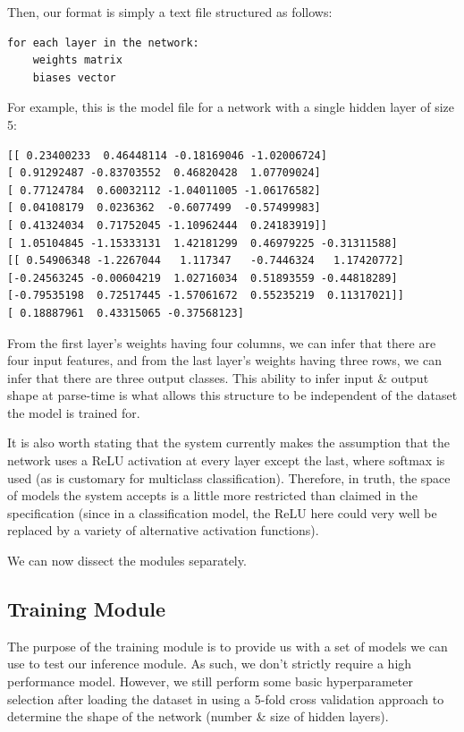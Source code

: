 \documentclass[12pt]{article}
\begin{document}
Then, our format is simply a text file structured as follows:
\begin{verbatim}
for each layer in the network:
    weights matrix
    biases vector
\end{verbatim}
For example, this is the model file for a network with a single hidden layer of size 5:
\begin{verbatim}
[[ 0.23400233  0.46448114 -0.18169046 -1.02006724]
[ 0.91292487 -0.83703552  0.46820428  1.07709024]
[ 0.77124784  0.60032112 -1.04011005 -1.06176582]
[ 0.04108179  0.0236362  -0.6077499  -0.57499983]
[ 0.41324034  0.71752045 -1.10962444  0.24183919]]
[ 1.05104845 -1.15333131  1.42181299  0.46979225 -0.31311588]
[[ 0.54906348 -1.2267044   1.117347   -0.7446324   1.17420772]
[-0.24563245 -0.00604219  1.02716034  0.51893559 -0.44818289]
[-0.79535198  0.72517445 -1.57061672  0.55235219  0.11317021]]
[ 0.18887961  0.43315065 -0.37568123]   
\end{verbatim}
From the first layer's weights having four columns, we can infer that there are four input features, and from the last layer's weights having three rows, we can infer that there are three output classes. This ability to infer input \& output shape at parse-time is what allows this structure to be independent of the dataset the model is trained for.\bigskip

It is also worth stating that the system currently makes the assumption that the network uses a ReLU activation at every layer except the last, where softmax is used (as is customary for multiclass classification). Therefore, in truth, the space of models the system accepts is a little more restricted than claimed in the specification (since in a classification model, the ReLU here could very well be replaced by a variety of alternative activation functions).\bigskip

We can now dissect the modules separately.

\subsection{Training Module}
The purpose of the training module is to provide us with a set of models we can use to test our inference module. As such, we don't strictly require a high performance model. However, we still perform some basic hyperparameter selection after loading the dataset in using a 5-fold cross validation approach to determine the shape of the network (number \& size of hidden layers).\bigskip
\end{document}
